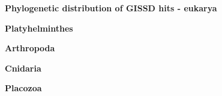 \documentclass[landscape]{slides}
\begin{document}
\begin{slide}
\begin{center}
\small
\textbf{Phylogenetic distribution of GISSD hits - eukarya}
\end{center}


\vfill
\end{slide}
\begin{slide}
\small
{}
\vfill
\end{slide}
\begin{slide}
\begin{center}
\textbf{Platyhelminthes}
\end{center}


\vfill
\end{slide}
\begin{slide}
\begin{center}
\textbf{Arthropoda}
\end{center}


\vfill
\end{slide}
\begin{slide}
\begin{center}
\textbf{Cnidaria}
\end{center}


\vfill
\end{slide}
\begin{slide}
\begin{center}
\textbf{Placozoa}
\end{center}


\vfill
\end{slide}
\end{document}
